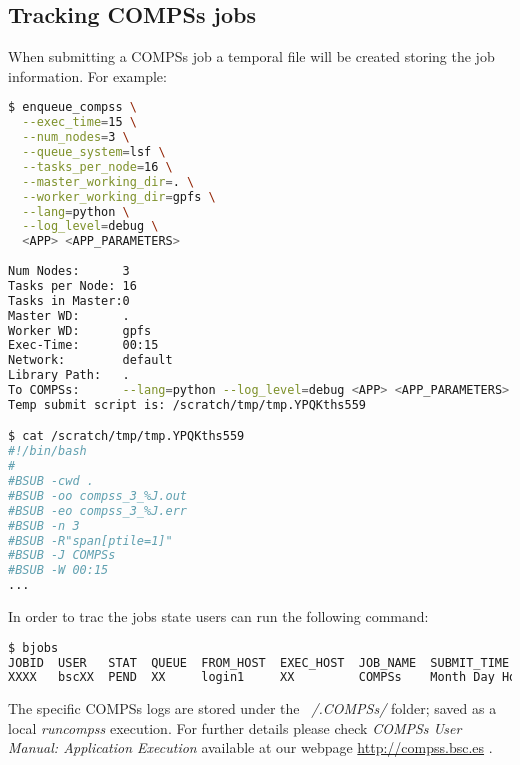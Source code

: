 \subsection{Tracking COMPSs jobs}
When submitting a COMPSs job a temporal file will be created storing the job information. For example:
\begin{lstlisting}[language=bash]
$ enqueue_compss \
  --exec_time=15 \
  --num_nodes=3 \
  --queue_system=lsf \
  --tasks_per_node=16 \
  --master_working_dir=. \
  --worker_working_dir=gpfs \
  --lang=python \
  --log_level=debug \
  <APP> <APP_PARAMETERS>
  
Num Nodes:      3
Tasks per Node: 16
Tasks in Master:0
Master WD:      .
Worker WD:      gpfs
Exec-Time:      00:15
Network:        default
Library Path:   .
To COMPSs:      --lang=python --log_level=debug <APP> <APP_PARAMETERS>
Temp submit script is: /scratch/tmp/tmp.YPQKths559

$ cat /scratch/tmp/tmp.YPQKths559
#!/bin/bash
#
#BSUB -cwd . 
#BSUB -oo compss_3_%J.out
#BSUB -eo compss_3_%J.err
#BSUB -n 3
#BSUB -R"span[ptile=1]" 
#BSUB -J COMPSs
#BSUB -W 00:15 
...
\end{lstlisting}

In order to trac the jobs state users can run the following command:
\begin{lstlisting}[language=bash]
$ bjobs
JOBID  USER   STAT  QUEUE  FROM_HOST  EXEC_HOST  JOB_NAME  SUBMIT_TIME
XXXX   bscXX  PEND  XX     login1     XX         COMPSs    Month Day Hour
\end{lstlisting}

The specific COMPSs logs are stored under the \textit{~/.COMPSs/} folder; saved as a local \textit{runcompss} execution. For further 
details please check \textit{COMPSs User Manual: Application Execution} available at our webpage \url{http://compss.bsc.es} .
